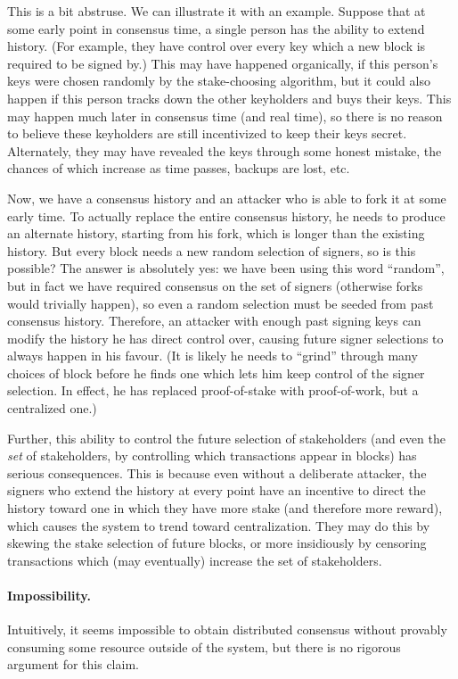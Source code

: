 \documentclass[letterpaper]{article}
\begin{document}
This is a bit abstruse. We can illustrate it with an example. Suppose that at some
early point in consensus time, a single person has the ability to extend history.
(For example, they have control over every key which a new block is required to be
signed by.) This may have happened organically, if this person's keys were chosen
randomly by the stake-choosing algorithm, but it could also happen if this person
tracks down the other keyholders and buys their keys. This may happen much later in
consensus time (and real time), so there is no reason to believe these keyholders
are still incentivized to keep their keys secret. Alternately, they may have revealed
the keys through some honest mistake, the chances of which increase as time passes,
backups are lost, etc.

Now, we have a consensus history and an attacker who is able to fork it at some
early time. To actually replace the entire consensus history, he needs to produce
an alternate history, starting from his fork, which is longer than the existing
history. But every block needs a new random selection of signers, so is this
possible? The answer is absolutely yes: we have been using this word ``random'',
but in fact we have required consensus on the set of signers (otherwise forks
would trivially happen), so even a random selection must be seeded from past consensus
history. Therefore, an attacker with enough past signing keys can modify the
history he has direct control over, causing future signer selections to always
happen in his favour. (It is likely he needs to ``grind'' through many choices
of block before he finds one which lets him keep control of the signer selection.
In effect, he has replaced proof-of-stake with proof-of-work, but a centralized
one.)

Further, this ability to control the future selection of stakeholders (and even
the \emph{set} of stakeholders, by controlling which transactions appear in blocks)
has serious consequences. This is because even without a deliberate attacker, the
signers who extend the history at every point have an incentive to direct the history
toward one in which they have more stake (and therefore more reward), which causes
the system to trend toward centralization. They may do this by skewing the stake
selection of future blocks, or more insidiously by censoring transactions which
(may eventually) increase the set of stakeholders.

\paragraph{Impossibility.}
Intuitively, it seems impossible to obtain distributed consensus without provably
consuming some resource outside of the system, but there is no rigorous argument
for this claim.
\end{document}
